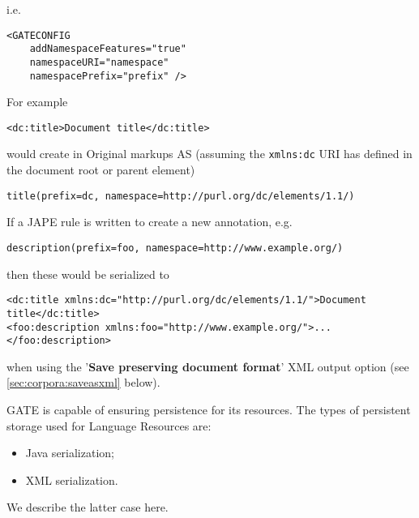 i.e.

\begin{small}
\begin{verbatim}<GATECONFIG 
	addNamespaceFeatures="true" 
	namespaceURI="namespace" 
	namespacePrefix="prefix" />\end{verbatim} 
\end{small}

For example

\begin{small}
\begin{verbatim}<dc:title>Document title</dc:title>\end{verbatim}
\end{small}
  
would create in Original markups AS (assuming the {\tt xmlns:dc} URI has defined in the document root or parent element)

\begin{small}
\begin{verbatim}title(prefix=dc, namespace=http://purl.org/dc/elements/1.1/)\end{verbatim} 
\end{small}

If a JAPE rule is written to create a new annotation, e.g.

\begin{small}
\begin{verbatim}description(prefix=foo, namespace=http://www.example.org/)\end{verbatim} 
\end{small}

then these would be serialized to

\begin{small}
\begin{verbatim}
<dc:title xmlns:dc="http://purl.org/dc/elements/1.1/">Document title</dc:title>
<foo:description xmlns:foo="http://www.example.org/">...</foo:description>
\end{verbatim}   
\end{small}

when using the '\textbf{Save preserving document format}' XML output option (see \ref{sec:corpora:saveasxml} below).  

  

GATE is capable of ensuring persistence for its resources.
The types of persistent
storage used for Language Resources are:
\begin{itemize}
\item Java serialization;
\item XML serialization.
\end{itemize}
We describe the latter case here.

